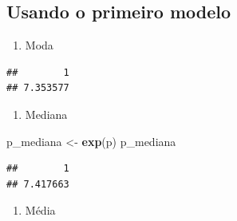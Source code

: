 \documentclass[]{article}
\newenvironment{Shaded}{\begin{snugshade}}{\end{snugshade}}
\newcommand{\KeywordTok}[1]{\textcolor[rgb]{0.13,0.29,0.53}{\textbf{#1}}}
\newcommand{\DataTypeTok}[1]{\textcolor[rgb]{0.13,0.29,0.53}{#1}}
\newcommand{\DecValTok}[1]{\textcolor[rgb]{0.00,0.00,0.81}{#1}}
\newcommand{\StringTok}[1]{\textcolor[rgb]{0.31,0.60,0.02}{#1}}
\newcommand{\OperatorTok}[1]{\textcolor[rgb]{0.81,0.36,0.00}{\textbf{#1}}}
\newcommand{\NormalTok}[1]{#1}
\providecommand{\tightlist}{%
  \setlength{\itemsep}{0pt}\setlength{\parskip}{0pt}}
\begin{document}
\subsection{Usando o primeiro modelo}\label{usando-o-primeiro-modelo}

\begin{enumerate}
\def\labelenumi{\alph{enumi}.}
\tightlist
\item
  Moda
\end{enumerate}

\begin{Shaded}
\end{Shaded}

\begin{verbatim}
##        1 
## 7.353577
\end{verbatim}

\begin{enumerate}
\def\labelenumi{\alph{enumi}.}
\setcounter{enumi}{1}
\tightlist
\item
  Mediana
\end{enumerate}

\begin{Shaded}
\begin{Highlighting}[]
\NormalTok{p_mediana <-}\StringTok{ }\KeywordTok{exp}\NormalTok{(p)}
\NormalTok{p_mediana}
\end{Highlighting}
\end{Shaded}

\begin{verbatim}
##        1 
## 7.417663
\end{verbatim}

\begin{enumerate}
\def\labelenumi{\alph{enumi}.}
\setcounter{enumi}{2}
\tightlist
\item
  Média
\end{enumerate}

\begin{Shaded}
\end{Shaded}
\end{document}
